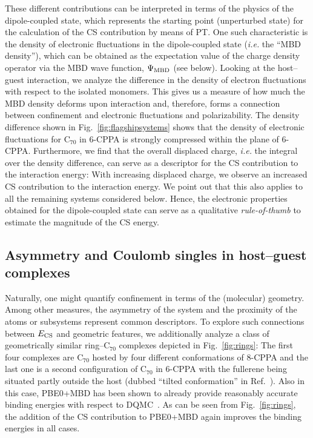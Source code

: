 \documentclass[aps,prl,groupaddress, twocolumn]{revtex4-1}  %
\begin{document}
These different contributions can be interpreted in terms of the physics of the dipole-coupled state, which represents the starting point (unperturbed state) for the calculation of the CS contribution by means of PT\@.
One such characteristic is the density of electronic fluctuations in the dipole-coupled state (\textit{i.e.} the ``MBD density''), which can be obtained as the expectation value of the charge density operator via the MBD wave function, $\Psi_{\rm MBD}$ (see below).
Looking at the host--guest interaction, we analyze the difference in the density of electron fluctuations with respect to the isolated monomers.
This gives us a measure of how much the MBD density deforms upon interaction and, therefore, forms a connection between confinement and electronic fluctuations and polarizability.
The density difference shown in Fig.~\ref{fig:flagshipsystems} %
shows that the density of electronic fluctuations for C$_{70}$ in 6-CPPA is strongly compressed within the plane of 6-CPPA\@.
Furthermore, we find that the overall displaced charge, \textit{i.e.} the integral over the density difference, can serve as a descriptor for the CS contribution to the interaction energy:
With increasing displaced charge, we observe an increased CS contribution to the interaction energy. We point out that this also applies to all the remaining systems considered below.
Hence, the electronic properties obtained for the dipole-coupled state can serve as a qualitative \emph{rule-of-thumb} to estimate the magnitude of the CS energy.

\subsection*{Asymmetry and Coulomb singles in host--guest complexes}

Naturally, one might quantify confinement in terms of the (molecular) geometry. Among other measures, the asymmetry of the system and the proximity of the atoms or subsystems represent common descriptors. To explore such connections between $E_{\rm CS}$ and geometric features, we additionally analyze a class of geometrically similar ring--C$_{70}$ complexes depicted in Fig.~\ref{fig:rings}: The first four complexes are C$_{70}$ hosted by four different conformations of 8-CPPA and the last one is a second configuration of C$_{70}$ in 6-CPPA with the fullerene being situated partly outside the host (dubbed ``tilted conformation'' in Ref.~\cite{hermann_ncomm2017}). Also in this case, PBE0+MBD has been shown to already provide reasonably accurate binding energies with respect to DQMC~\cite{hermann_ncomm2017}. As can be seen from Fig.~\ref{fig:rings}, the addition of the CS contribution to PBE0+MBD again improves the binding energies in all cases.
\end{document}
